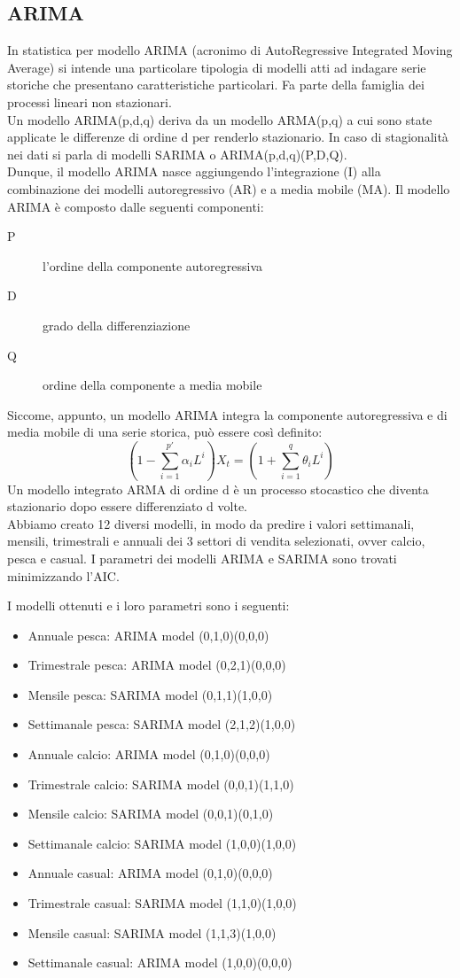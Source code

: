 \documentclass[12pt, a4paper, twocolumn]{article} %
\begin{document}
\subsection{ARIMA}
In statistica per modello ARIMA (acronimo di AutoRegressive Integrated Moving Average) si intende una particolare tipologia di modelli atti ad indagare serie storiche che presentano caratteristiche particolari. Fa parte della famiglia dei processi lineari non stazionari.\\
Un modello ARIMA(p,d,q) deriva da un modello ARMA(p,q) a cui sono state applicate le differenze di ordine d per renderlo stazionario. In caso di stagionalità nei dati si parla di modelli SARIMA o ARIMA(p,d,q)(P,D,Q).\\
Dunque, il modello ARIMA nasce aggiungendo l'integrazione (I) alla combinazione dei modelli autoregressivo (AR) e a media mobile (MA). Il modello ARIMA è composto dalle seguenti componenti:
\begin{description}
	\item[P] l'ordine della componente autoregressiva
	\item[D] grado della differenziazione
	\item[Q] ordine della componente a media mobile
\end{description}
Siccome, appunto, un modello ARIMA integra la componente autoregressiva e di media mobile di una serie storica, può essere così definito:
\[
(1 - \sum_{i=1}^{p'}\alpha_iL^i)X_t = (1+\sum_{i=1}^{q}\theta_iL^i)	
\]
 Un modello integrato ARMA di ordine d è un processo stocastico che diventa stazionario dopo essere differenziato d volte.\\

Abbiamo creato 12 diversi modelli, in modo da predire i valori settimanali, mensili, trimestrali e annuali dei 3 settori di vendita selezionati, ovver calcio, pesca e casual. I parametri dei modelli ARIMA e SARIMA sono trovati minimizzando l'AIC.

I modelli ottenuti e i loro parametri sono i seguenti:
\begin{itemize}
	\item Annuale pesca: ARIMA model (0,1,0)(0,0,0)
	\item Trimestrale pesca: ARIMA model (0,2,1)(0,0,0)
	\item Mensile pesca: SARIMA model (0,1,1)(1,0,0)
	\item Settimanale pesca: SARIMA model (2,1,2)(1,0,0)
	\item Annuale calcio: ARIMA model (0,1,0)(0,0,0)
	\item Trimestrale calcio: SARIMA model (0,0,1)(1,1,0)
	\item Mensile calcio: SARIMA model (0,0,1)(0,1,0)
	\item Settimanale calcio: SARIMA model (1,0,0)(1,0,0)
	\item Annuale casual: ARIMA model (0,1,0)(0,0,0)
	\item Trimestrale casual: SARIMA model (1,1,0)(1,0,0)
	\item Mensile casual: SARIMA model (1,1,3)(1,0,0)
	\item Settimanale casual: ARIMA model (1,0,0)(0,0,0)
\end{itemize}
\end{document}

